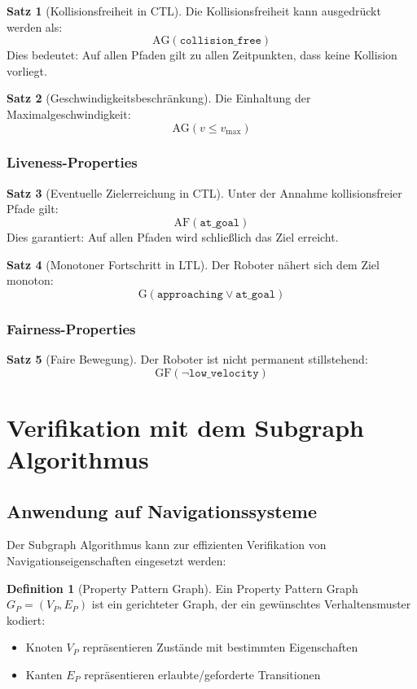 ﻿\documentclass[a4paper,12pt]{article}
\theoremstyle{definition}
\newtheorem{definition}{Definition}[section]
\newtheorem{satz}{Satz}[section]
\begin{document}
\begin{satz}[Kollisionsfreiheit in CTL]
Die Kollisionsfreiheit kann ausgedrückt werden als:
\[
\text{AG}(\texttt{collision\_free})
\]
Dies bedeutet: Auf allen Pfaden gilt zu allen Zeitpunkten, dass keine Kollision vorliegt.
\end{satz}

\begin{satz}[Geschwindigkeitsbeschränkung]
Die Einhaltung der Maximalgeschwindigkeit:
\[
\text{AG}(v \leq v_{\max})
\]
\end{satz}

\subsubsection{Liveness-Properties}

\begin{satz}[Eventuelle Zielerreichung in CTL]
Unter der Annahme kollisionsfreier Pfade gilt:
\[
\text{AF}(\texttt{at\_goal})
\]
Dies garantiert: Auf allen Pfaden wird schließlich das Ziel erreicht.
\end{satz}

\begin{satz}[Monotoner Fortschritt in LTL]
Der Roboter nähert sich dem Ziel monoton:
\[
\text{G}(\texttt{approaching} \lor \texttt{at\_goal})
\]
\end{satz}

\subsubsection{Fairness-Properties}

\begin{satz}[Faire Bewegung]
Der Roboter ist nicht permanent stillstehend:
\[
\text{GF}(\neg \texttt{low\_velocity})
\]
\end{satz}

\section{Verifikation mit dem Subgraph Algorithmus}

\subsection{Anwendung auf Navigationssysteme}

Der Subgraph Algorithmus kann zur effizienten Verifikation von Navigationseigenschaften eingesetzt werden:

\begin{definition}[Property Pattern Graph]
Ein Property Pattern Graph $G_P = (V_P, E_P)$ ist ein gerichteter Graph, der ein gewünschtes Verhaltensmuster kodiert:
\begin{itemize}
	\item Knoten $V_P$ repräsentieren Zustände mit bestimmten Eigenschaften
	\item Kanten $E_P$ repräsentieren erlaubte/geforderte Transitionen
\end{itemize}
\end{definition}
\end{document}
